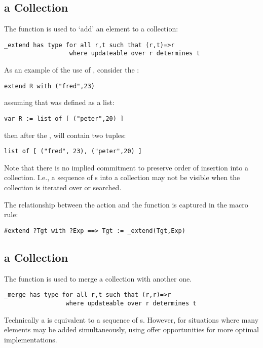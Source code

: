 \subsection{ a Collection}
\label{extend}
The  function is used to `add' an element to a collection:
\begin{lstlisting}
_extend has type for all r,t such that (r,t)=>r
                  where updateable over r determines t
\end{lstlisting}

As an example of the use of , consider the :
\begin{lstlisting}
extend R with ("fred",23)
\end{lstlisting}
assuming that  was defined as a list:
\begin{lstlisting}
var R := list of [ ("peter",20) ]
\end{lstlisting}
then after the ,  will contain two tuples:
\begin{lstlisting}
list of [ ("fred", 23), ("peter",20) ]
\end{lstlisting}

\begin{aside}
Note that there is no implied commitment to preserve order of insertion into a collection. I.e., a sequence of s into a collection may not be visible when the collection is iterated over or searched.
\end{aside}

The relationship between the  action and the  function is captured in the macro rule:
\begin{lstlisting}
#extend ?Tgt with ?Exp ==> Tgt := _extend(Tgt,Exp)
\end{lstlisting}


\subsection{ a Collection}
\label{merge}
The  function is used to merge a collection with another one.
\begin{lstlisting}
_merge has type for all r,t such that (r,r)=>r
                 where updateable over r determines t
\end{lstlisting}

\begin{aside}
Technically a  is equivalent to a sequence of s. However, for situations where many elements may be added simultaneously, using  offer opportunities for more optimal implementations.
\end{aside}

